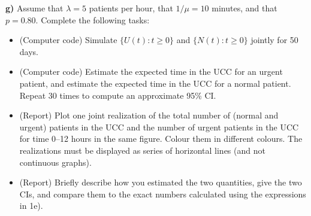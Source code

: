 \documentclass[1p]{article}		%
\begin{document}
\textbf{g)} Assume that $\lambda = 5$ patients per hour, that $1/\mu = 10$ minutes, and that
$p = 0.80$. Complete the following tasks:
\begin{itemize}
  \item
    (Computer code) Simulate $\{U(t): t\geq 0\}$ and $\{N(t): t \geq 0\}$ jointly for 50 days.
  \item
    (Computer code) Estimate the expected time in the UCC for an urgent patient, and estimate the expected time in the UCC for a normal patient. Repeat 30 times to compute an
    approximate 95\% CI.
  \item
    (Report) Plot one joint realization of the total number of (normal and urgent) patients in the UCC and the
    number of urgent patients in the UCC for time 0--12 hours in the same figure. Colour them in different
    colours. The realizations must be displayed as series of horizontal lines (and not continuous graphs).
  \item
    (Report) Briefly describe how you estimated the two quantities, give the two CIs, 
    and compare them to the exact numbers calculated using the expressions in 1e).
\end{itemize}
\end{document}
